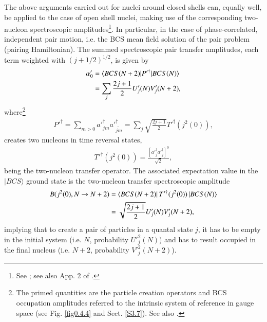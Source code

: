 The above arguments carried out for nuclei around closed shells can,  equally well, be applied to the case of open shell nuclei, making use of the corresponding two-nucleon spectroscopic amplitudes\footnote{See \cite{Yoshida:62}; see also App. 2 of \cite{Broglia:73}.}.
In particular, in the case of phase-correlated, independent pair motion, i.e. the BCS mean field solution of the pair problem (pairing Hamiltonian). The summed spectroscopic pair transfer amplitudes,  each term weighted with $(j+1/2)^{1/2}$, is given by
\begin{align}\label{eq1.2.14}
\nonumber \alpha_0'&=\langle {BCS(N+2)|P'^\dagger|BCS(N)} \rangle\\
&=\sum_{j}\frac{2j+1}{2}U'_j(N)V'_j(N+2),
\end{align}
where\footnote{The primed quantities are the particle creation operators and BCS occupation amplitudes referred to the intrinsic system of reference in gauge space (see  Fig. \ref{fig0.4.4} and Sect. \ref{S3.7}). See also \cite{Potel:13b}.}
\begin{align}\label{eq1.2.15}
P'^\dagger=\sum_{m>0}a'^\dagger_{jm}a'^\dagger_{\widetilde{jm}}=\sum_j\sqrt{\frac{2j+1}{2}}T'^{\dagger}(j^2(0)),
\end{align}
creates two nucleons in time reversal states, 
\begin{align}\label{eq1.2.16}
T'^{\dagger}(j^2(0))=\frac{\left[a'^\dagger_ja'^\dagger_j\right]^0}{\sqrt{2}},
\end{align}
being the two-nucleon transfer operator. The associated expectation value in the $|BCS\rangle$ ground state is the two-nucleon transfer spectroscopic amplitude  
\begin{align}\label{eq1.2.17}
\nonumber B(j^2(0),N\to N+2)&=\langle {BCS(N+2)|\,T'^\dagger(j^2(0))\,|BCS(N)} \rangle\\
&=\sqrt{\frac{2j+1}{2}}U'_j(N)V'_j(N+2),
\end{align}
implying that to create a pair of particles in a quantal state $j$, it has to be empty in the initial system (i.e. $N$, probability $U'^2_j(N)$) and has to result occupied in the final nucleus (i.e. $N+2$, probability $V'^2_j(N+2)$).  


